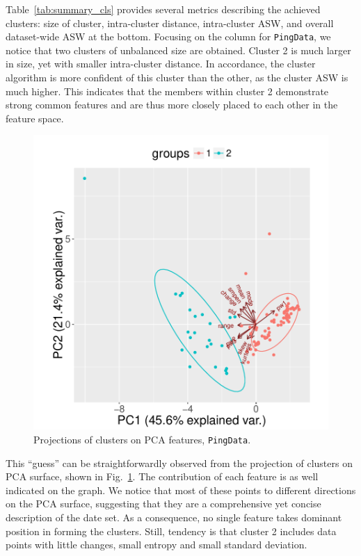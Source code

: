 Table~\ref{tab:summary_cls} provides several metrics describing the achieved clusters: size of cluster, intra-cluster distance, intra-cluster \ac{ASW}, and overall dataset-wide \ac{ASW} at the bottom.
Focusing on the column for \texttt{PingData}, we notice that two clusters of unbalanced size are obtained.
Cluster 2 is much larger in size, yet with smaller intra-cluster distance. 
In accordance, the cluster algorithm is more confident of this cluster than the other, as the cluster \ac{ASW} is much higher.
This indicates that the members within cluster 2 demonstrate strong common features and are thus more closely placed to each other in the feature space.

\begin{figure}[!htb]
\centering
\includegraphics[width=.6\textwidth]{gfx/chap3/ping_pca_ping.pdf}
\caption{Projections of clusters on \ac{PCA} features, \texttt{PingData}.}
\label{fig:ping_pca}
\end{figure}

This ``guess'' can be straightforwardly observed from the projection of clusters on \acf{PCA} surface, shown in Fig.~\ref{fig:ping_pca}.
The contribution of each feature is as well indicated on the graph.
We notice that most of these points to different directions on the \ac{PCA} surface, suggesting that they are a comprehensive yet concise description of the date set.
As a consequence, no single feature takes dominant position in forming the clusters.
Still, tendency is that cluster 2 includes data points with little  changes, small entropy and small standard deviation. 

